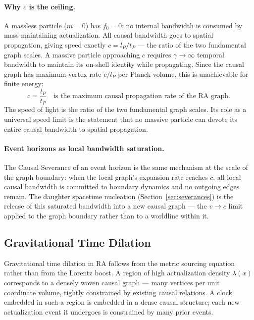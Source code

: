 \documentclass[11pt,a4paper]{article}
\theoremstyle{plain}
\theoremstyle{definition}
\theoremstyle{remark}
\begin{document}
\paragraph{Why $c$ is the ceiling.}
A massless particle ($m = 0$) has $f_0 = 0$: no internal bandwidth is
consumed by mass-maintaining actualization. All causal bandwidth goes to
spatial propagation, giving speed exactly $c = l_P/t_P$ --- the ratio of
the two fundamental graph scales. A massive particle approaching $c$ requires
$\gamma \to \infty$ temporal bandwidth to maintain its on-shell identity
while propagating. Since the causal graph has maximum vertex rate
$c/l_P$ per Planck volume, this is unachievable for finite energy:
\begin{equation}
  c = \frac{l_P}{t_P}
  \quad \text{is the maximum causal propagation rate of the RA graph.}
  \label{eq:c_ceiling}
\end{equation}
The speed of light is the ratio of the two fundamental graph scales.
Its role as a universal speed limit is the statement that no massive
particle can devote its entire causal bandwidth to spatial propagation.

\paragraph{Event horizons as local bandwidth saturation.}
The Causal Severance of an event horizon is the same mechanism at the
scale of the graph boundary: when the local graph's expansion rate reaches
$c$, all local causal bandwidth is committed to boundary dynamics and no
outgoing edges remain. The daughter spacetime nucleation
(Section~\ref{sec:severances}) is the release of this saturated
bandwidth into a new causal graph --- the $v \to c$ limit applied to
the graph boundary rather than to a worldline within it.

\subsection{Gravitational Time Dilation}
\label{subsec:grav_dilation}

Gravitational time dilation in RA follows from the metric sourcing equation
rather than from the Lorentz boost. A region of high actualization density
$\lambda(x)$ corresponds to a densely woven causal graph --- many vertices per
unit coordinate volume, tightly constrained by existing causal relations. A
clock embedded in such a region is embedded in a dense causal structure; each
new actualization event it undergoes is constrained by many prior events.
\end{document}
